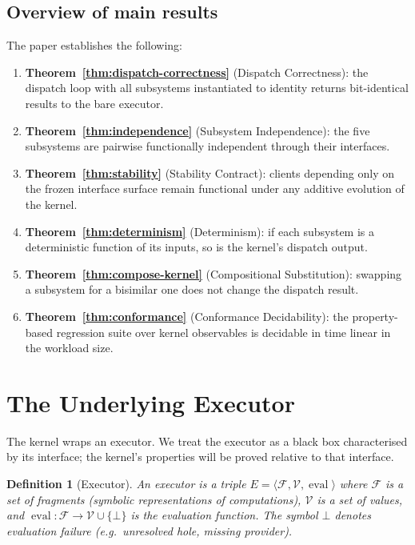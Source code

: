 \documentclass[twocolumn,11pt,a4paper]{article}
\newtheorem{definition}[theorem]{Definition}
\DeclareMathOperator{\eval}{eval}
\newcommand{\Vals}{\mathcal{V}}
\newcommand{\Exec}{E}
\begin{document}
\subsection{Overview of main results}

The paper establishes the following:
\begin{enumerate}[nosep,leftmargin=*]
\item \textbf{Theorem~\ref{thm:dispatch-correctness}} (Dispatch Correctness): the dispatch loop with all subsystems instantiated to identity returns bit-identical results to the bare executor.
\item \textbf{Theorem~\ref{thm:independence}} (Subsystem Independence): the five subsystems are pairwise functionally independent through their interfaces.
\item \textbf{Theorem~\ref{thm:stability}} (Stability Contract): clients depending only on the frozen interface surface remain functional under any additive evolution of the kernel.
\item \textbf{Theorem~\ref{thm:determinism}} (Determinism): if each subsystem is a deterministic function of its inputs, so is the kernel's dispatch output.
\item \textbf{Theorem~\ref{thm:compose-kernel}} (Compositional Substitution): swapping a subsystem for a bisimilar one does not change the dispatch result.
\item \textbf{Theorem~\ref{thm:conformance}} (Conformance Decidability): the property-based regression suite over kernel observables is decidable in time linear in the workload size.
\end{enumerate}

\section{The Underlying Executor}
\label{sec:executor}

The kernel wraps an executor. We treat the executor as a black box characterised by its interface; the kernel's properties will be proved relative to that interface.

\begin{definition}[Executor]
\label{def:executor}
An \emph{executor} is a triple $\Exec = \langle \mathcal{F}, \Vals, \eval \rangle$ where $\mathcal{F}$ is a set of \emph{fragments} (symbolic representations of computations), $\Vals$ is a set of \emph{values}, and $\eval : \mathcal{F} \to \Vals \cup \{\bot\}$ is the \emph{evaluation function}. The symbol $\bot$ denotes evaluation failure (e.g.\ unresolved hole, missing provider).
\end{definition}
\end{document}
